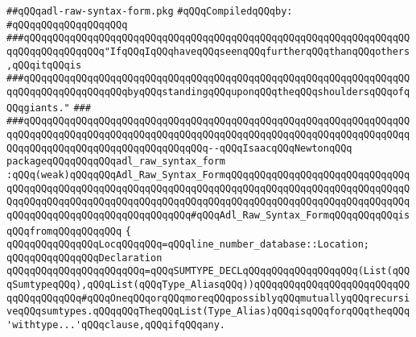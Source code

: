 \label{src/lib/compiler/back/low/tools/adl-syntax/adl-raw-syntax-form.pkg}
\verb|##qQQqadl-raw-syntax-form.pkg|\newline
\newline
\verb|#qQQqCompiledqQQqby:|\newline
\verb|#qQQqqQQqqQQqqQQqqQQq|\newline
\newline
\newline
\newline
\verb|###qQQqqQQqqQQqqQQqqQQqqQQqqQQqqQQqqQQqqQQqqQQqqQQqqQQqqQQqqQQqqQQqqQQqqQQqqQQqqQQqqQQq"IfqQQqIqQQqhaveqQQqseenqQQqfurtherqQQqthanqQQqothers,qQQqitqQQqis|\newline
\verb|###qQQqqQQqqQQqqQQqqQQqqQQqqQQqqQQqqQQqqQQqqQQqqQQqqQQqqQQqqQQqqQQqqQQqqQQqqQQqqQQqqQQqqQQqbyqQQqstandingqQQquponqQQqtheqQQqshouldersqQQqofqQQqgiants."|\newline
\verb|###|\newline
\verb|###qQQqqQQqqQQqqQQqqQQqqQQqqQQqqQQqqQQqqQQqqQQqqQQqqQQqqQQqqQQqqQQqqQQqqQQqqQQqqQQqqQQqqQQqqQQqqQQqqQQqqQQqqQQqqQQqqQQqqQQqqQQqqQQqqQQqqQQqqQQqqQQqqQQqqQQqqQQqqQQqqQQqqQQqqQQq--qQQqIsaacqQQqNewtonqQQq|\newline
\newline
\newline
\newline
\verb|packageqQQqqQQqqQQqadl_raw_syntax_form|\newline
\verb|:qQQq(weak)qQQqqQQqAdl_Raw_Syntax_FormqQQqqQQqqQQqqQQqqQQqqQQqqQQqqQQqqQQqqQQqqQQqqQQqqQQqqQQqqQQqqQQqqQQqqQQqqQQqqQQqqQQqqQQqqQQqqQQqqQQqqQQqqQQqqQQqqQQqqQQqqQQqqQQqqQQqqQQqqQQqqQQqqQQqqQQqqQQqqQQqqQQqqQQqqQQqqQQqqQQqqQQqqQQqqQQqqQQqqQQqqQQq#qQQqAdl_Raw_Syntax_FormqQQqqQQqqQQqisqQQqfromqQQqqQQqqQQq|\newline
\verb|{|\newline
\verb|qQQqqQQqqQQqqQQqLocqQQqqQQq=qQQqline_number_database::Location;|\newline
\newline
\verb|qQQqqQQqqQQqqQQqDeclaration|\newline
\verb|qQQqqQQqqQQqqQQqqQQqqQQq=qQQqSUMTYPE_DECLqQQqqQQqqQQqqQQqqQQq(List(qQQqSumtypeqQQq),qQQqList(qQQqType_AliasqQQq))qQQqqQQqqQQqqQQqqQQqqQQqqQQqqQQqqQQqqQQq#qQQqOneqQQqorqQQqmoreqQQqpossiblyqQQqmutuallyqQQqrecursiveqQQqsumtypes.qQQqqQQqTheqQQqList(Type_Alias)qQQqisqQQqforqQQqtheqQQq'withtype...'qQQqclause,qQQqifqQQqany.|\newline
